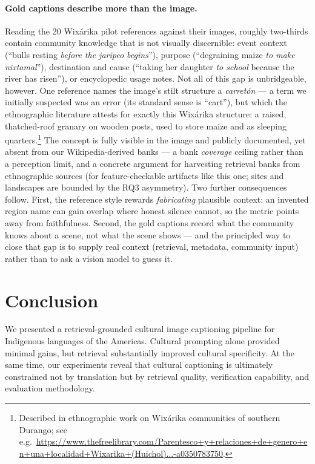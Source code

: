 \documentclass[11pt]{article}
\begin{document}
\paragraph{Gold captions describe more than the image.}
Reading the 20 Wixárika pilot references against their images, roughly
two-thirds contain community knowledge that is not visually discernible:
event context (``bulls resting \emph{before the jaripeo begins}''), purpose
(``degraining maize \emph{to make nixtamal}''), destination and cause
(``taking her daughter \emph{to school} because the river has risen''), or
encyclopedic usage notes. Not all of this gap is unbridgeable, however. One
reference names the image's stilt structure a \emph{carretón} --- a term we
initially suspected was an error (its standard sense is ``cart''), but which
the ethnographic literature attests for exactly this Wixárika structure: a
raised, thatched-roof granary on wooden posts, used to store maize and as
sleeping quarters.\footnote{Described in ethnographic work on Wixárika
communities of southern Durango; see e.g.\
\url{https://www.thefreelibrary.com/Parentesco+y+relaciones+de+genero+en+una+localidad+Wixarika+(Huichol)...-a0350783750}.}
The concept is fully visible in the image and publicly documented, yet
absent from our Wikipedia-derived banks --- a bank \emph{coverage} ceiling
rather than a perception limit, and a concrete argument for harvesting
retrieval banks from ethnographic sources (for feature-checkable artifacts
like this one; sites and landscapes are bounded by the RQ3 asymmetry). Two
further consequences follow. First, the reference style rewards
\emph{fabricating} plausible context: an invented region name can gain
overlap where honest silence cannot, so the metric points away from
faithfulness. Second, the gold captions record what the community knows
about a scene, not what the scene shows --- and the principled way to close
that gap is to supply real context (retrieval, metadata, community input)
rather than to ask a vision model to guess it.


\section{Conclusion}
We presented a retrieval-grounded cultural image captioning pipeline for
Indigenous languages of the Americas. Cultural prompting alone provided
minimal gains, but retrieval substantially improved cultural specificity. At
the same time, our experiments reveal that cultural captioning is ultimately
constrained not by translation but by retrieval quality, verification
capability, and evaluation methodology.
\end{document}
